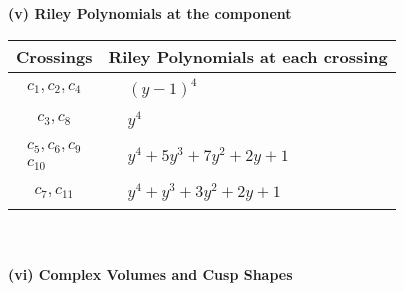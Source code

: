 \documentclass[1p]{elsarticle_modified}
\theoremstyle{definition}
\begin{document}
\newpage\renewcommand{\arraystretch}{1}
\flushleft \textbf{(v) Riley Polynomials at the component}\newline \\
\begin{tabular}{m{50pt}|m{274pt}}
Crossings & \hspace{64pt}Riley Polynomials at each crossing \\
\hline $$\begin{aligned}c_{1},c_{2},c_{4}\end{aligned}$$&$\begin{aligned}
&(y-1)^4
\end{aligned}$\\
\hline $$\begin{aligned}c_{3},c_{8}\end{aligned}$$&$\begin{aligned}
&y^4
\end{aligned}$\\
\hline $$\begin{aligned}c_{5},c_{6},c_{9}\\c_{10}\end{aligned}$$&$\begin{aligned}
&y^4+5 y^3+7 y^2+2 y+1
\end{aligned}$\\
\hline $$\begin{aligned}c_{7},c_{11}\end{aligned}$$&$\begin{aligned}
&y^4+y^3+3 y^2+2 y+1
\end{aligned}$\\
\hline
\end{tabular}\\~\\
\newpage\flushleft \textbf{(vi) Complex Volumes and Cusp Shapes}
\end{document}
